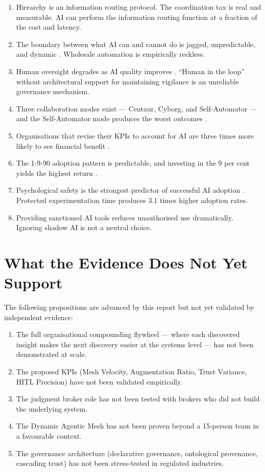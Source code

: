 \begin{enumerate}
  \item Hierarchy is an information routing protocol. The coordination tax is real and measurable. AI can perform the information routing function at a fraction of the cost and latency.
  \item The boundary between what AI can and cannot do is jagged, unpredictable, and dynamic \parencite{DellAcqua2026}. Wholesale automation is empirically reckless.
  \item Human oversight degrades as AI quality improves \parencite{DellAcqua2023}. ``Human in the loop'' without architectural support for maintaining vigilance is an unreliable governance mechanism.
  \item Three collaboration modes exist --- Centaur, Cyborg, and Self-Automator --- and the Self-Automator mode produces the worst outcomes \parencite{Randazzo2024}.
  \item Organisations that revise their KPIs to account for AI are three times more likely to see financial benefit \parencite{BCGAIKPIs2025}.
  \item The 1-9-90 adoption pattern is predictable, and investing in the 9 per cent yields the highest return \parencite{BCGAgenticShift2025}.
  \item Psychological safety is the strongest predictor of successful AI adoption \parencite{EdmondsonLei2025, GoogleAristotle2025}. Protected experimentation time produces 3.1 times higher adoption rates.
  \item Providing sanctioned AI tools reduces unauthorised use dramatically. Ignoring shadow AI is not a neutral choice.
\end{enumerate}

\section{What the Evidence Does Not Yet Support}

The following propositions are advanced by this report but not yet validated by independent evidence:

\begin{enumerate}
  \item The full organisational compounding flywheel --- where each discovered insight makes the next discovery easier at the systems level --- has not been demonstrated at scale.
  \item The proposed KPIs (Mesh Velocity, Augmentation Ratio, Trust Variance, HITL Precision) have not been validated empirically.
  \item The judgment broker role has not been tested with brokers who did not build the underlying system.
  \item The Dynamic Agentic Mesh has not been proven beyond a 15-person team in a favourable context.
  \item The governance architecture (declarative governance, ontological provenance, cascading trust) has not been stress-tested in regulated industries.
\end{enumerate}

